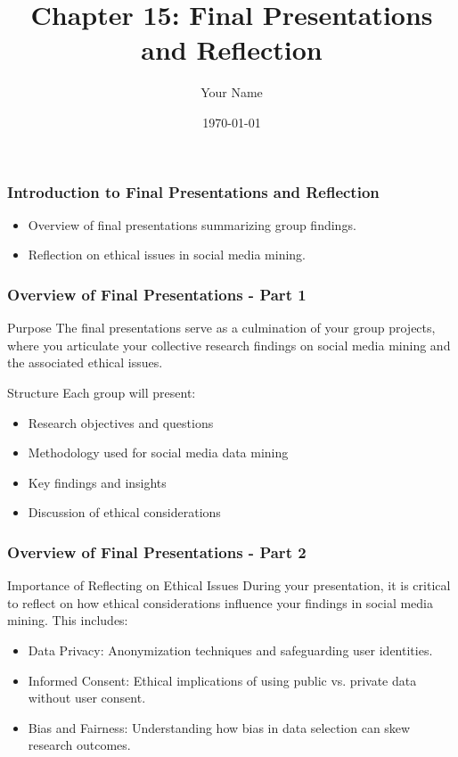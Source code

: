 \documentclass{beamer}
\title{Chapter 15: Final Presentations and Reflection}
\author{Your Name}
\institute{Your Institution}
\date{\today}
\begin{document}
\frame{\titlepage}

\begin{frame}[fragile]
    \frametitle{Introduction to Final Presentations and Reflection}
    \begin{itemize}
        \item Overview of final presentations summarizing group findings.
        \item Reflection on ethical issues in social media mining.
    \end{itemize}
\end{frame}

\begin{frame}[fragile]
    \frametitle{Overview of Final Presentations - Part 1}
    \begin{block}{Purpose}
        The final presentations serve as a culmination of your group projects, 
        where you articulate your collective research findings on social media 
        mining and the associated ethical issues.
    \end{block}
    
    \begin{block}{Structure}
        Each group will present:
        \begin{itemize}
            \item Research objectives and questions
            \item Methodology used for social media data mining
            \item Key findings and insights
            \item Discussion of ethical considerations
        \end{itemize}
    \end{block}
\end{frame}

\begin{frame}[fragile]
    \frametitle{Overview of Final Presentations - Part 2}
    \begin{block}{Importance of Reflecting on Ethical Issues}
        During your presentation, it is critical to reflect on how ethical 
        considerations influence your findings in social media mining. This includes:
    \end{block}

    \begin{itemize}
        \item Data Privacy: Anonymization techniques and safeguarding user identities.
        \item Informed Consent: Ethical implications of using public vs. private data without user consent.
        \item Bias and Fairness: Understanding how bias in data selection can skew research outcomes.
    \end{itemize}
\end{frame}
\end{document}
